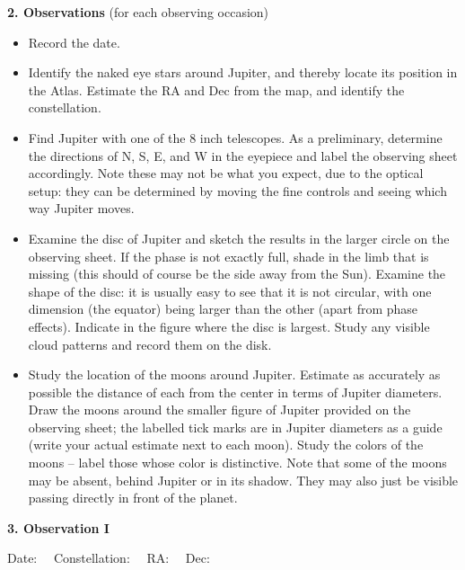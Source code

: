 \documentclass[12pt]{article}
\begin{document}
\bigskip
\noindent
{\bf 2. Observations} (for each observing occasion)

\begin{itemize}
\item Record the date.

\item Identify the naked eye stars around Jupiter, and thereby locate its
position in the Atlas. Estimate the RA and Dec from the map,
and identify the constellation.
 
\item Find Jupiter with one of the 8 inch telescopes. 
As a preliminary, determine the directions of N, S, E, and W
in the eyepiece and label the observing sheet
accordingly. Note these may not be what you expect, due to the
optical setup: they can be determined by moving the fine controls and
seeing which way Jupiter moves.

\item Examine the disc of Jupiter and sketch the
results in the larger circle on the observing sheet. If the phase is
not exactly full, shade in the limb that is missing (this should of
course be the side away from the Sun). Examine the shape
of the disc: it is usually easy to see that it is not circular, with
one dimension (the equator) being larger than the other (apart from
phase effects). Indicate in the figure where the disc is largest.
Study any visible cloud patterns and record them on the disk.

\item Study the location of the moons around Jupiter. Estimate as
accurately as possible the distance of each from the center in terms
of Jupiter diameters. Draw the moons around the smaller figure of
Jupiter provided on the observing sheet; the labelled tick marks are
in Jupiter diameters as a guide (write your actual estimate next to
each moon). Study the colors of the moons -- label those whose color
is distinctive. Note that some of the moons may be absent, behind
Jupiter or in its shadow. They may also just be visible passing
directly in front of the planet.
 

\end{itemize}


\newpage
\noindent
{\bf 3. Observation I}
\bigskip\bigskip
\noindent

Date: \makebox[2cm]{\hrulefill} \ \ 
Constellation: \makebox[2cm]{\hrulefill} \ \ 
RA: \makebox[2cm]{\hrulefill} \ \ 
Dec: \makebox[2cm]{\hrulefill} \ \ 

\bigskip
\bigskip
\bigskip
\begin{figure}[h]
\centerline{}

\vspace{1.0cm}

\centerline{}

\end{figure}
\end{document}

